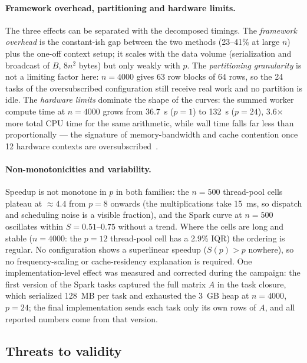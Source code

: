 \documentclass[11pt,a4paper]{article}
\begin{document}
\paragraph{Framework overhead, partitioning and hardware limits.}
The three effects can be separated with the decomposed timings. The
\emph{framework overhead} is the constant-ish gap between the two methods
(23--41\% at large $n$) plus the one-off context setup; it scales with
the data volume (serialization and broadcast of $B$, $8n^2$ bytes) but
only weakly with $p$. The \emph{partitioning granularity} is not a
limiting factor here: $n = 4000$ gives 63 row blocks of 64 rows, so the
24 tasks of the oversubscribed configuration still receive real work and
no partition is idle. The \emph{hardware limits} dominate the shape of
the curves: the summed worker compute time at $n = 4000$ grows from
36.7~s ($p = 1$) to 132~s ($p = 24$), 3.6$\times$ more total CPU time for
the same arithmetic, while wall time falls far less than proportionally
--- the signature of memory-bandwidth and cache contention once 12
hardware contexts are oversubscribed~\cite{hennessy2017}.

\paragraph{Non-monotonicities and variability.}
Speedup is not monotone in $p$ in both families: the $n = 500$ thread-pool
cells plateau at $\approx 4.4$ from $p = 8$ onwards (the multiplications
take 15~ms, so dispatch and scheduling noise is a visible fraction), and
the Spark curve at $n = 500$ oscillates within $S = 0.51$--$0.75$ without
a trend. Where the cells are long and stable ($n = 4000$: the $p = 12$
thread-pool cell has a 2.9\% IQR) the ordering is regular. No
configuration shows a superlinear speedup ($S(p) > p$ nowhere), so no
frequency-scaling or cache-residency explanation is required. One
implementation-level effect was measured and corrected during the
campaign: the first version of the Spark tasks captured the full matrix
$A$ in the task closure, which serialized 128~MB per task and exhausted
the 3~GB heap at $n = 4000$, $p = 24$; the final implementation sends
each task only its own rows of $A$, and all reported numbers come from
that version.

\subsection{Threats to validity}
\end{document}
